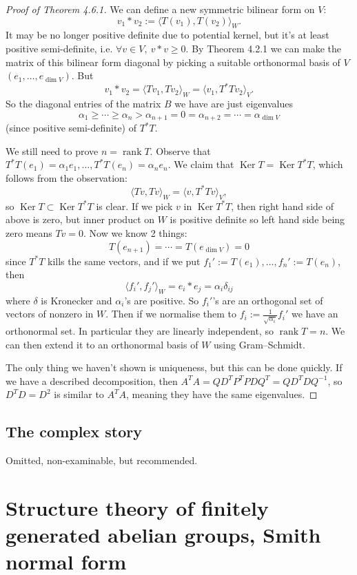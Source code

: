 \documentclass[a4paper]{article}
\newcommand{\Ker}{\operatorname{Ker}}
\newcommand{\rank}{\operatorname{rank}}
\theoremstyle{definition}
\begin{document}
\begin{proof}[Proof of Theorem 4.6.1]
We can define a new symmetric bilinear form on $V$:
\[
v_1 \ast v_2 := \langle T(v_1) , T(v_2)\rangle_W.
\]
It may be no longer positive definite due to potential kernel, but it's at least positive semi-definite, i.e. $\forall v \in V,\ v \ast v \geq 0.$ By Theorem 4.2.1 we can make the matrix of this bilinear form diagonal by picking a suitable orthonormal basis of $V$ $(e_1,\ldots,e_{\dim V})$. But
\[
v_1 \ast v_2 = \langle Tv_1, Tv_2 \rangle_W = \langle v_1, T^\ast T v_2 \rangle_V.
\]
So the diagonal entries of the matrix $B$ we have are just eigenvalues
\[
\alpha_1 \geq \cdots \geq \alpha_n > \alpha_{n+1}=0=\alpha_{n+2} = \cdots = \alpha_{\dim V}
\]
(since positive semi-definite) of $T^\ast T$. 

We still need to prove $n=\rank T$. Observe that $T^\ast T(e_1) = \alpha_1 e_1, \ldots, T^\ast T(e_n) = \alpha_n e_n.$ We claim that $\Ker T= \Ker T^\ast T$, which follows from the observation:
\[
\langle Tv, Tv \rangle_W=\langle v,T^\ast Tv \rangle_V,
\]
so $\Ker T \subset \Ker T^\ast T$ is clear. If we pick $v$ in $\Ker T^\ast T$, then right hand side of above is zero, but inner product on $W$ is positive definite so left hand side being zero means $Tv=0$. Now we know 2 things: 
\[
T(e_{n+1}) = \cdots = T(e_{\dim V}) =0
\]
since $T^\ast T$ kills the same vectors, and if we put $f_1':= T(e_1), \ldots, f_n':=T(e_n)$, then
\[
\langle f_i' , f_j' \rangle_W = e_i \ast e_j = \alpha_i \delta_{ij}
\]
where $\delta$ is Kronecker and $\alpha_i$'s are positive. So $f_i'$'s are an orthogonal set of vectors of nonzero in $W$. Then if we normalise them to $f_i:=\frac{1}{\sqrt{\alpha_i}} f_i'$ we have an orthonormal set. In particular they are linearly independent, so $\rank T=n$. We can then extend it to an orthonormal basis of $W$ using Gram--Schmidt.

The only thing we haven't shown is uniqueness, but this can be done quickly. If we have a described decomposition, then $A^T A= QD^T P^T PDQ^T=QD^T D Q^{-1}$, so $D^TD=D^2$ is similar to $A^TA$, meaning they have the same eigenvalues.
\end{proof}

\subsection{The complex story}
Omitted, non-examinable, but recommended.

\section{Structure theory of finitely generated abelian groups, Smith normal form}
\end{document}

